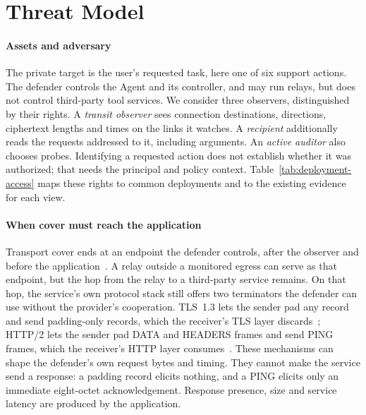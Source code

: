 \section{Threat Model}\label{sec:threat}
\paragraph{Assets and adversary}
The private target is the user's requested task, here one of six support actions. The defender controls the Agent and its controller, and may run relays, but does not control third-party tool services. We consider three observers, distinguished by their rights. A \emph{transit observer} sees connection destinations, directions, ciphertext lengths and times on the links it watches. A \emph{recipient} additionally reads the requests addressed to it, including arguments. An \emph{active auditor} also chooses probes. Identifying a requested action does not establish whether it was authorized; that needs the principal and policy context. Table~\ref{tab:deployment-access} maps these rights to common deployments and to the existing evidence for each view.



\paragraph{When cover must reach the application}
Transport cover ends at an endpoint the defender controls, after the observer and before the application~\cite{apthorpe2019stp}. A relay outside a monitored egress can serve as that endpoint, but the hop from the relay to a third-party service remains. On that hop, the service's own protocol stack still offers two terminators the defender can use without the provider's cooperation. TLS~1.3 lets the sender pad any record and send padding-only records, which the receiver's TLS layer discards~\cite[Sec.~5.4]{rfc8446}; HTTP/2 lets the sender pad DATA and HEADERS frames and send PING frames, which the receiver's HTTP layer consumes~\cite[Secs.~6.1, 6.7]{rfc9113}. These mechanisms can shape the defender's own request bytes and timing. They cannot make the service send a response: a padding record elicits nothing, and a PING elicits only an immediate eight-octet acknowledgement. Response presence, size and service latency are produced by the application.

